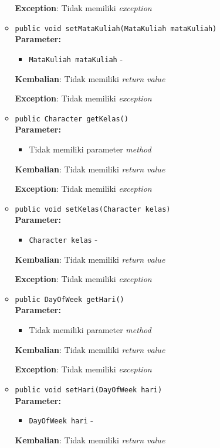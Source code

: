 \documentclass{article}
\begin{document}
\begin{enumerate}
\begin{itemize}
\textbf{Exception}: Tidak memiliki \textit{exception}

\item \texttt{public void setMataKuliah(MataKuliah mataKuliah)}\\ 


\textbf{Parameter:}\begin{itemize}
\item \texttt{MataKuliah mataKuliah} - 
\end{itemize}
\textbf{Kembalian}: Tidak memiliki \textit{return value}

\textbf{Exception}: Tidak memiliki \textit{exception}

\item \texttt{public Character getKelas()}\\ 


\textbf{Parameter:}\begin{itemize}
\item Tidak memiliki parameter \textit{method}
\end{itemize}
\textbf{Kembalian}: Tidak memiliki \textit{return value}

\textbf{Exception}: Tidak memiliki \textit{exception}

\item \texttt{public void setKelas(Character kelas)}\\ 


\textbf{Parameter:}\begin{itemize}
\item \texttt{Character kelas} - 
\end{itemize}
\textbf{Kembalian}: Tidak memiliki \textit{return value}

\textbf{Exception}: Tidak memiliki \textit{exception}

\item \texttt{public DayOfWeek getHari()}\\ 


\textbf{Parameter:}\begin{itemize}
\item Tidak memiliki parameter \textit{method}
\end{itemize}
\textbf{Kembalian}: Tidak memiliki \textit{return value}

\textbf{Exception}: Tidak memiliki \textit{exception}

\item \texttt{public void setHari(DayOfWeek hari)}\\ 


\textbf{Parameter:}\begin{itemize}
\item \texttt{DayOfWeek hari} - 
\end{itemize}
\textbf{Kembalian}: Tidak memiliki \textit{return value}


\end{itemize}
\end{enumerate}
\end{document}
